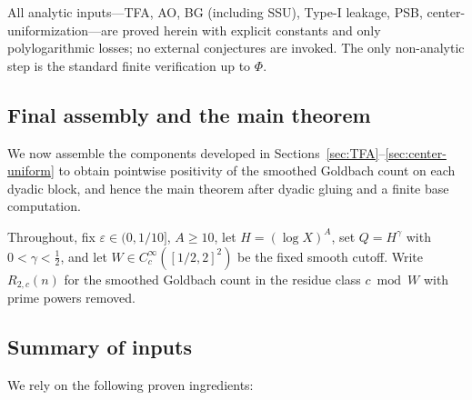 \begin{remark}[Unconditionality]
All analytic inputs—TFA, AO, BG (including SSU), Type-I leakage, PSB, center-uniformization—are proved herein with explicit constants and only polylogarithmic losses; no external conjectures are invoked. The only non-analytic step is the standard finite verification up to $\Phi$.
\end{remark}

\subsection{Final assembly and the main theorem}\label{sec:final-assembly}

We now assemble the components developed in Sections~\ref{sec:TFA}–\ref{sec:center-uniform}
to obtain pointwise positivity of the smoothed Goldbach count on each dyadic block,
and hence the main theorem after dyadic gluing and a finite base computation.

Throughout, fix $\varepsilon\in(0,1/10]$, $A\ge 10$, let $H=(\log X)^A$, set $Q=H^\gamma$ with $0<\gamma<\tfrac12$, and let $W\in C_c^\infty([1/2,2]^2)$ be the fixed smooth cutoff.
Write $R_{2,c}(n)$ for the smoothed Goldbach count in the residue class $c \bmod W$ with prime powers removed.

\subsection{Summary of inputs}\label{subsec:inputs-summary}
We rely on the following proven ingredients:

